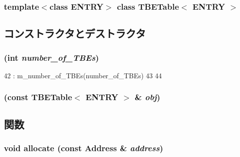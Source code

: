 \subsubsection*{template$<$class ENTRY$>$ class TBETable$<$ ENTRY $>$}



\subsection{コンストラクタとデストラクタ}
\hypertarget{classTBETable_ac5f2ff856f2cb9f8a695ef3daa7fa9eb}{
\subsubsection[{TBETable}]{ (int {\em number\_\-of\_\-TBEs})}}
\label{classTBETable_ac5f2ff856f2cb9f8a695ef3daa7fa9eb}



\begin{DoxyCode}
42         : m_number_of_TBEs(number_of_TBEs)
43     {
44     }
\end{DoxyCode}
\hypertarget{classTBETable_a431b9127dc77b1431db45225a81e84af}{
\subsubsection[{TBETable}]{ (const {\bf TBETable}$<$ ENTRY $>$ \& {\em obj})}}
\label{classTBETable_a431b9127dc77b1431db45225a81e84af}


\subsection{関数}
\hypertarget{classTBETable_a5b0f65e7d424629299a1ade3553e5bc1}{
\subsubsection[{allocate}]{\setlength{\rightskip}{0pt plus 5cm}void allocate (const {\bf Address} \& {\em address})}}
\label{classTBETable_a5b0f65e7d424629299a1ade3553e5bc1}



